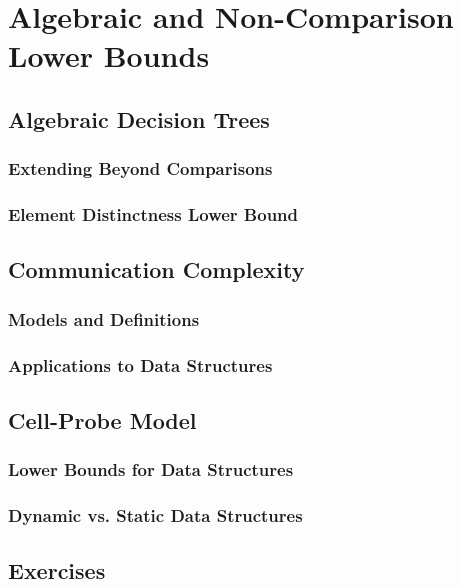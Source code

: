 \chapter{Algebraic and Non-Comparison Lower Bounds}
\section{Algebraic Decision Trees}
\subsection{Extending Beyond Comparisons}
\subsection{Element Distinctness Lower Bound}

\section{Communication Complexity}
\subsection{Models and Definitions}
\subsection{Applications to Data Structures}

\section{Cell-Probe Model}
\subsection{Lower Bounds for Data Structures}
\subsection{Dynamic vs. Static Data Structures}

\section{Exercises}